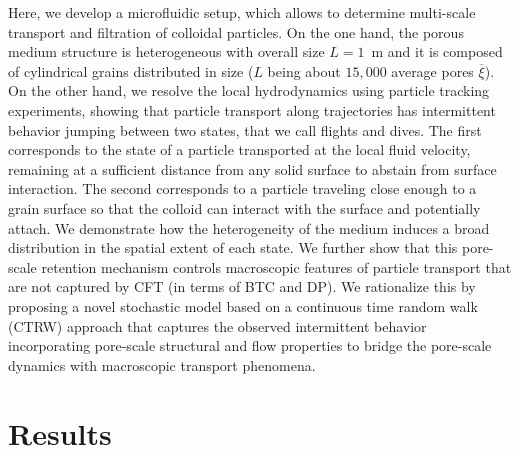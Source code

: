 \documentclass[singlecolumn,pre,notitlepage,preprintnumbers,floatfix,superscriptaddress]{revtex4-1}
\begin{document}
 \noindent
Here, we develop a microfluidic setup, which allows to determine multi-scale transport and filtration of colloidal particles. On the one hand, the porous medium structure is heterogeneous with overall size $L = 1$~m and it is composed of cylindrical grains distributed in size ($L$ being about $15,000$ average pores $\overline{\xi}$). On the other hand, we resolve the local hydrodynamics using particle tracking experiments, showing that particle transport along trajectories has intermittent behavior jumping between two states, that we call flights and dives. The first corresponds to the state of a particle transported at the local fluid velocity, remaining at a sufficient distance from any solid surface to abstain from surface interaction. The second corresponds to a particle traveling close enough to a grain surface so that the colloid can interact with the surface and potentially attach. We demonstrate how the heterogeneity of the medium induces a broad distribution in the spatial extent of each state. We further show that this pore-scale retention mechanism controls macroscopic features of particle transport that are not captured by CFT (in terms of BTC and DP). We rationalize this by proposing a novel stochastic model based on a continuous time random walk (CTRW) approach that captures the observed intermittent behavior incorporating pore-scale structural and flow properties to bridge the pore-scale dynamics with macroscopic transport phenomena.


\section*{Results}
\end{document}
